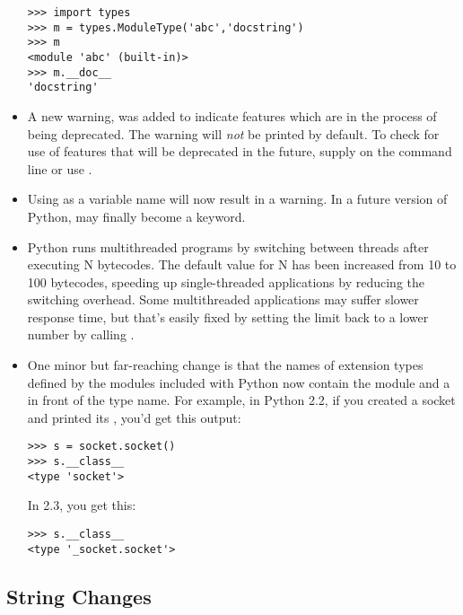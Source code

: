 \documentclass{howto}
\begin{document}
\begin{itemize}
\begin{verbatim}
>>> import types
>>> m = types.ModuleType('abc','docstring')
>>> m
<module 'abc' (built-in)>
>>> m.__doc__
'docstring'
\end{verbatim}

\item
A new warning,  was added to
indicate features which are in the process of being
deprecated.  The warning will \emph{not} be printed by default.  To
check for use of features that will be deprecated in the future,
supply  on the
command line or use .

\item Using  as a variable name will now result in a
 warning.  In a future version of Python,
 may finally become a keyword.

\item Python runs multithreaded programs by switching between threads
after executing N bytecodes.  The default value for N has been
increased from 10 to 100 bytecodes, speeding up single-threaded
applications by reducing the switching overhead.  Some multithreaded
applications may suffer slower response time, but that's easily fixed
by setting the limit back to a lower number by calling
.

\item One minor but far-reaching change is that the names of extension
types defined by the modules included with Python now contain the
module and a  in front of the type name.  For example, in
Python 2.2, if you created a socket and printed its
, you'd get this output:

\begin{verbatim}
>>> s = socket.socket()
>>> s.__class__
<type 'socket'>
\end{verbatim}

In 2.3, you get this:
\begin{verbatim}
>>> s.__class__
<type '_socket.socket'>
\end{verbatim}

\end{itemize}


\subsection{String Changes}
\end{document}
